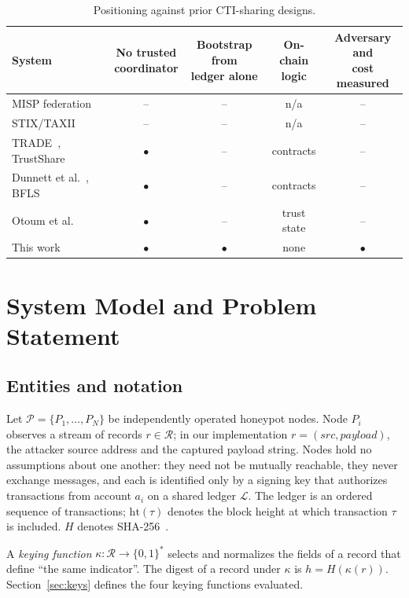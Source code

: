 \documentclass[conference]{IEEEtran}
\newcommand{\Ledger}{\mathcal{L}}
\begin{document}
\begin{table}[!t]
\caption{Positioning against prior CTI-sharing designs.}
\label{tab:compare}
\centering
\scriptsize
\setlength{\tabcolsep}{3pt}
\begin{tabular}{@{}lcccc@{}}
\toprule
System & \shortstack{No trusted\\coordinator} & \shortstack{Bootstrap from\\ledger alone} & \shortstack{On-chain\\logic} & \shortstack{Adversary and\\cost measured} \\
\midrule
MISP federation~\cite{ref1,ref8} & -- & -- & n/a & -- \\
STIX/TAXII~\cite{ref2,ref3} & -- & -- & n/a & -- \\
TRADE~\cite{ref5}, TrustShare~\cite{ref6} & $\bullet$ & -- & contracts & -- \\
Dunnett et al.~\cite{ref7}, BFLS~\cite{ref10} & $\bullet$ & -- & contracts & -- \\
Otoum et al.~\cite{ref16} & $\bullet$ & -- & trust state & -- \\
This work & $\bullet$ & $\bullet$ & none & $\bullet$ \\
\bottomrule
\end{tabular}
\end{table}

\section{System Model and Problem Statement}
\label{sec:model}

\subsection{Entities and notation}
Let $\mathcal{P}=\{P_1,\dots,P_N\}$ be independently operated honeypot nodes. Node $P_i$ observes a stream of records $r\in\mathcal{R}$; in our implementation $r=(\mathit{src},\mathit{payload})$, the attacker source address and the captured payload string. Nodes hold no assumptions about one another: they need not be mutually reachable, they never exchange messages, and each is identified only by a signing key that authorizes transactions from account $a_i$ on a shared ledger $\Ledger$. The ledger is an ordered sequence of transactions; $\mathrm{ht}(\tau)$ denotes the block height at which transaction $\tau$ is included. $H$ denotes SHA-256~\cite{ref17}.

A \emph{keying function} $\kappa:\mathcal{R}\to\{0,1\}^*$ selects and normalizes the fields of a record that define ``the same indicator''. The digest of a record under $\kappa$ is $h=H(\kappa(r))$. Section~\ref{sec:keys} defines the four keying functions evaluated.
\end{document}
